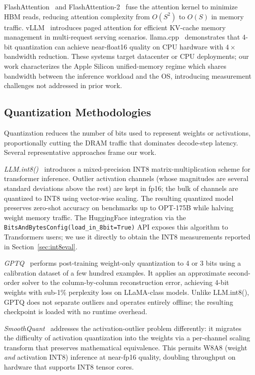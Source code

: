 \documentclass[conference]{IEEEtran}
\begin{document}
FlashAttention~\cite{dao2022} and FlashAttention-2~\cite{dao2023} fuse
the attention kernel to minimize HBM reads, reducing attention complexity
from $O(S^2)$ to $O(S)$ in memory traffic. vLLM~\cite{kwon2023}
introduces paged attention for efficient KV-cache memory management in
multi-request serving scenarios. llama.cpp~\cite{gerganov2023}
demonstrates that 4-bit quantization can achieve near-float16 quality on
CPU hardware with $4\times$ bandwidth reduction. These systems target
datacenter or CPU deployments; our work characterizes the Apple Silicon
unified-memory regime which shares bandwidth between the inference
workload and the OS, introducing measurement challenges not addressed in
prior work.

\subsection{Quantization Methodologies}

Quantization reduces the number of bits used to represent weights or
activations, proportionally cutting the DRAM traffic that dominates
decode-step latency. Several representative approaches frame our work.

\textit{LLM.int8()}~\cite{dettmers2022} introduces a mixed-precision
INT8 matrix-multiplication scheme for transformer inference. Outlier
activation channels (whose magnitudes are several standard deviations
above the rest) are kept in fp16; the bulk of channels are quantized to
INT8 using vector-wise scaling. The resulting quantized model preserves
zero-shot accuracy on benchmarks up to OPT-175B while halving weight
memory traffic. The HuggingFace integration via the
\texttt{BitsAndBytesConfig(load\_in\_8bit=True)} API exposes this
algorithm to Transformers users; we use it directly to obtain the INT8
measurements reported in Section~\ref{sec:int8eval}.

\textit{GPTQ}~\cite{frantar2022} performs post-training weight-only
quantization to 4 or 3 bits using a calibration dataset of a few hundred
examples. It applies an approximate second-order solver to the
column-by-column reconstruction error, achieving 4-bit weights with
sub-1\% perplexity loss on LLaMA-class models. Unlike LLM.int8(), GPTQ
does not separate outliers and operates entirely offline; the resulting
checkpoint is loaded with no runtime overhead.

\textit{SmoothQuant}~\cite{xiao2023} addresses the activation-outlier
problem differently: it migrates the difficulty of activation
quantization into the weights via a per-channel scaling transform that
preserves mathematical equivalence. This permits W8A8 (weight \emph{and}
activation INT8) inference at near-fp16 quality, doubling throughput on
hardware that supports INT8 tensor cores.
\end{document}
